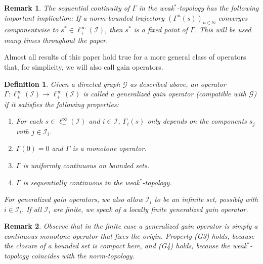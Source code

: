 \documentclass[10pt, oneside, a4paper]{article}
\newcommand{\N}{\mathbb{N}}
\newcommand{\GC}{\mathcal{G}}
\newcommand{\IC}{\mathcal{I}}
\newtheorem{definition}{Definition}[section]
\newtheorem{remark}{Remark}[section]
\begin{document}
\begin{remark}
The sequential continuity of $\Gamma$ in the weak$^*$-topology has the following important implication: If a norm-bounded trajectory $(\Gamma^n(s))_{n\in\N}$ converges componentwise to $s^* \in \ell^{\infty}_+(\IC)$, then $s^*$ is a fixed point of $\Gamma$. This will be used many times throughout the paper.
\end{remark}

Almost all results of this paper hold true for a more general class of operators that, for simplicity, we will also call gain operators.%

\begin{definition}
Given a directed graph $\GC$ as described above, an operator $\Gamma:\ell^{\infty}_+(\IC) \rightarrow \ell^{\infty}_+(\IC)$ is called a \emph{generalized gain operator (compatible with $\GC$)} if it satisfies the following properties:%
\begin{enumerate}
\item[(G1)] For each $s \in \ell^{\infty}_+(\IC)$ and $i \in \IC$, $\Gamma_i(s)$ only depends on the components $s_j$ with $j \in \IC_i$.%
\item[(G2)] $\Gamma(0) = 0$ and $\Gamma$ is a monotone operator.%
\item[(G3)] $\Gamma$ is uniformly continuous on bounded sets.%
\item[(G4)] $\Gamma$ is sequentially continuous in the weak$^*$-topology.%
\end{enumerate}
For generalized gain operators, we also allow $\IC_i$ to be an infinite set, possibly with $i \in \IC_i$. If all $\IC_i$ are finite, we speak of a \emph{locally finite generalized gain operator}.
\end{definition}

\begin{remark}
Observe that in the finite case a generalized gain operator is simply a continuous monotone operator that fixes the origin. Property (G3) holds, because the closure of a bounded set is compact here, and (G4) holds, because the weak$^*$-topology coincides with the norm-topology.
\end{remark}
\end{document}
